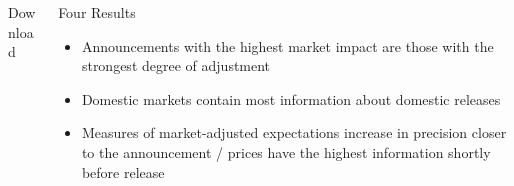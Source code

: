 \documentclass[final]{beamer}
\begin{document}
\begin{frame}
\begin{columns}[t]
\begin{column}{.53 \linewidth}
\begin{columns}[t]
\begin{column}{.48 \linewidth}
\begin{block}{Download}
\begin{itemize}
\end{itemize}

\end{block}%

\end{column}%

\begin{column}{.48 \linewidth}%

\vspace{.4 cm}%

%
%
%
%
%
%
%
\begin{block}{Four Results}

\begin{itemize}

\item Announcements with the highest market impact are
those with the strongest degree of adjustment

\item Domestic markets contain most information about domestic
releases

\item Measures of market-adjusted expectations increase in precision closer to
the announcement / prices have the highest information shortly before release


\end{itemize}
\end{block}
\end{column}
\end{columns}
\end{column}
\end{columns}
\end{frame}
\end{document}

